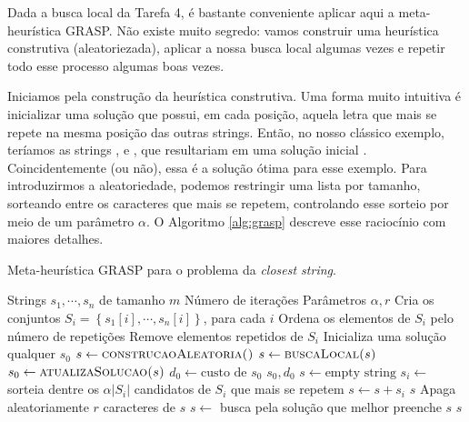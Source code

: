 Dada a busca local da Tarefa 4, é bastante conveniente aplicar aqui a meta-heurística GRASP. Não existe muito segredo: vamos construir uma heurística construtiva (aleatoriezada), aplicar a nossa busca local algumas vezes e repetir todo esse processo algumas boas vezes.

Iniciamos pela construção da heurística construtiva. Uma forma muito intuitiva é inicializar uma solução que possui, em cada posição, aquela letra que mais se repete na mesma posição das outras strings. Então, no nosso clássico exemplo, teríamos as strings
,  e ,
que resultariam em uma solução inicial . Coincidentemente (ou não), essa é a solução ótima para esse exemplo.
Para introduzirmos a aleatoriedade, podemos restringir uma lista por tamanho, sorteando entre os caracteres que mais se repetem, controlando esse sorteio por meio de um parâmetro $\alpha$. O Algoritmo \ref{alg:grasp} descreve esse raciocínio com maiores detalhes.

\begin{algorithm}
    \caption{Meta-heurística GRASP para o problema da \textit{closest string}.}
    \label{alg:grasp}
    \begin{algorithmic}
        \Require Strings $s_1, \cdots, s_n$ de tamanho $m$
        \Require Número de iterações
        \Require Parâmetros $\alpha, r$
        \State Cria os conjuntos $S_i = \left\{s_1[i], \cdots, s_n[i]\right\}$, para cada $i$
        \State Ordena os elementos de $S_i$ pelo número de repetições
        \State Remove elementos repetidos de $S_i$
        \State Inicializa uma solução qualquer $s_0$
            \State $s \gets \textsc{construcaoAleatoria()}$
            \State $s \gets \textsc{buscaLocal($s$)}$
            \State $s_0 \gets \textsc{atualizaSolucao($s$)}$
        \EndFor
        \State $d_0 \gets \text{custo de } s_0$
        \State \Return $s_0, d_0$
        \State
            \State $s \gets \text{empty string}$
                \State $s_i \gets$ sorteia dentre os $\alpha|S_i|$ candidatos de $S_i$ que mais se repetem
                \State $s \gets s + s_i$
            \EndFor
            \State \Return $s$
        \EndProcedure
        \State
            \State Apaga aleatoriamente $r$ caracteres de $s$
            \State $s \gets$ busca pela solução que melhor preenche $s$ 
            \State \Return $s$
        \EndProcedure
    \end{algorithmic}
\end{algorithm}

